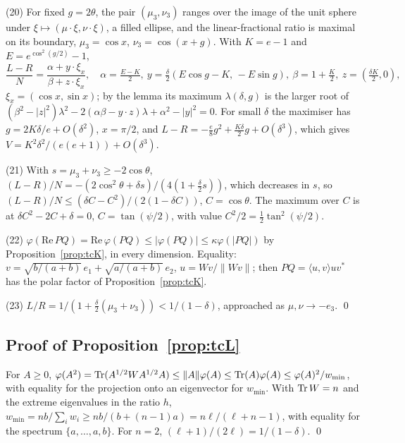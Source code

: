 (20) For fixed $g=2\theta$, the pair $(\mu_3,\nu_3)$ ranges over the image of the unit sphere under
$\xi\mapsto(\mu\cdot\xi,\nu\cdot\xi)$, a filled ellipse, and the linear-fractional ratio is maximal on its boundary,
$\mu_3=\cos x$, $\nu_3=\cos(x+g)$. With $K=e-1$ and $E=e^{\cos^2(g/2)}-1$,
\[
\frac{L-R}N=\frac{\alpha+y\cdot\xi_x}{\beta+z\cdot\xi_x},\quad \alpha=\tfrac{E-K}2,\ y=\tfrac\delta2(E\cos g-K,\,-E\sin g),
\ \beta=1+\tfrac K2,\ z=(\tfrac{\delta K}2,0),
\]
$\xi_x=(\cos x,\sin x)$; by the lemma its maximum $\lambda(\delta,g)$ is the larger root of
$(\beta^2-|z|^2)\lambda^2-2(\alpha\beta-y\cdot z)\lambda+\alpha^2-|y|^2=0$. For small $\delta$ the maximiser has
$g=2K\delta/e+O(\delta^2)$, $x=\pi/2$, and $L-R=-\frac e8g^2+\frac{K\delta}2g+O(\delta^3)$, which gives
$V=K^2\delta^2/(e(e+1))+O(\delta^3)$.

(21) With $s=\mu_3+\nu_3\ge-2\cos\theta$, $(L-R)/N=-(2\cos^2\theta+\delta s)/(4(1+\frac\delta2s))$, which decreases in $s$,
so $(L-R)/N\le(\delta C-C^2)/(2(1-\delta C))$, $C=\cos\theta$. The maximum over $C$ is at
$\delta C^2-2C+\delta=0$, $C=\tan(\psi/2)$, with value $C^2/2=\frac12\tan^2(\psi/2)$.

(22) $\varphi(\mathrm{Re}\,PQ)=\mathrm{Re}\,\varphi(PQ)\le|\varphi(PQ)|\le\kappa\varphi(|PQ|)$ by
Proposition~\ref{prop:tcK}, in every dimension. Equality: $v=\sqrt{b/(a+b)}\,e_1+\sqrt{a/(a+b)}\,e_2$, $u=Wv/\|Wv\|$;
then $PQ=\langle u,v\rangle uv^*$ has the polar factor of Proposition~\ref{prop:tcK}.

(23) $L/R=1/(1+\frac\delta2(\mu_3+\nu_3))<1/(1-\delta)$, approached as $\mu,\nu\to-e_3$. \qed

\subsection*{Proof of Proposition~\ref{prop:tcL}}
For $A\ge0$, $\varphi(A^2)=\operatorname{Tr}(A^{1/2}WA^{1/2}A)\le\|A\|\varphi(A)\le\operatorname{Tr}(A)\varphi(A)\le\varphi(A)^2/w_{\min}$, with
equality for the projection onto an eigenvector for $w_{\min}$. With $\operatorname{Tr} W=n$ and the extreme eigenvalues in the
ratio $h$, $w_{\min}=nb/\sum_iw_i\ge nb/(b+(n-1)a)=n\ell/(\ell+n-1)$, with equality for the spectrum
$\{a,\dots,a,b\}$. For $n=2$, $(\ell+1)/(2\ell)=1/(1-\delta)$. \qed

